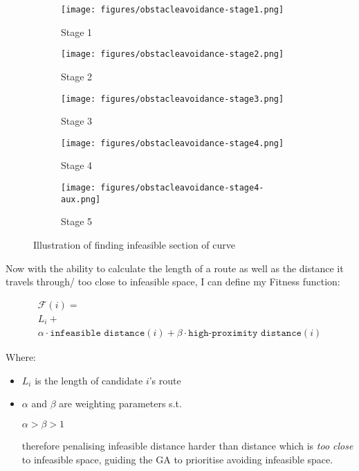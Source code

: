 \begin{figure}
  \centering
  \begin{subfigure}[b]{0.44\textwidth}
    \centering
    \texttt{[image: figures/obstacleavoidance-stage1.png]}
    \caption{Stage 1}
  \end{subfigure}
  \begin{subfigure}[b]{0.44\textwidth}
    \centering
    \texttt{[image: figures/obstacleavoidance-stage2.png]}
    \caption{Stage 2}
  \end{subfigure}
  \begin{subfigure}[b]{0.44\textwidth}
    \centering
    \texttt{[image: figures/obstacleavoidance-stage3.png]}
    \caption{Stage 3}
  \end{subfigure}
  \begin{subfigure}[b]{0.44\textwidth}
    \centering
    \texttt{[image: figures/obstacleavoidance-stage4.png]}
    \caption{Stage 4}
  \end{subfigure}
  \begin{subfigure}[b]{0.44\textwidth}
    \centering
    \texttt{[image: figures/obstacleavoidance-stage4-aux.png]}
    \caption{Stage 5}
  \end{subfigure}
  \caption{\label{fig:ifspace-illustration} Illustration of finding infeasible section of curve}
\end{figure}

Now with the ability to calculate the length of a route as well as the distance it travels through/ too close to infeasible space, I can define my Fitness function:

\begin{multline}\label{eq:basefitness}
  \mathcal{F}(i) = \\
  L_{i} +\\
  \alpha \cdot \texttt{infeasible distance}(i) + \beta \cdot \texttt{high-proximity distance}(i)
\end{multline}

Where:
\begin{itemize}
  \item $L_{i}$ is the length of candidate $i$'s route
  \item \(\alpha\) and \(\beta\) are weighting parameters s.t.

        $\alpha > \beta > 1$

        therefore penalising infeasible distance harder than distance which is \textit{too close} to infeasible space, guiding the GA to prioritise avoiding infeasible space.
\end{itemize}

